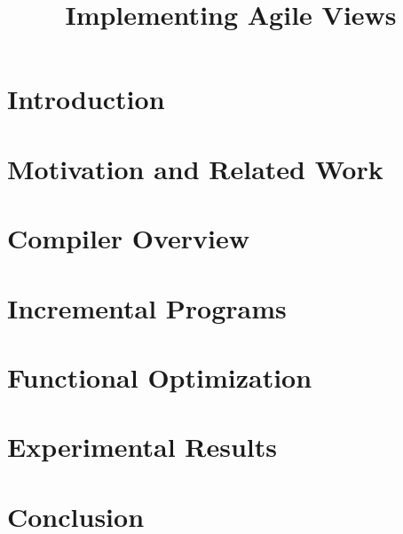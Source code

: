 \documentclass{sig-alternate}
\title{Implementing Agile Views}
\author{
}
\begin{document}
\maketitle

\section{Introduction}
\label{sec:introduction}


\section{Motivation and Related Work}
\label{sec:dbfail}


\section{Compiler Overview}
\label{sec:compiler}


\section{Incremental Programs}
\label{sec:iprogram}


\section{Functional Optimization}
\label{sec:functional}


\section{Experimental Results}
\label{sec:experiments}


\section{Conclusion}


\end{document}
